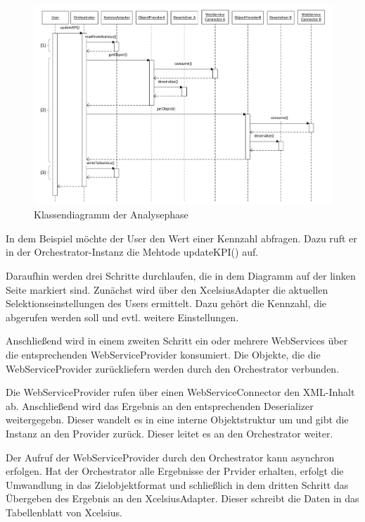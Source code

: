 \begin{figure}[h]
\centering
\setlength{\unitlength}{1mm}
\includegraphics[width=15cm]{Visio/Analyse-Sequenz.pdf}
\caption{Klassendiagramm der Analysephase\label{fig:sequenz_analyse}}
\end{figure}


In dem Beispiel möchte der User den Wert einer Kennzahl abfragen. Dazu ruft er in der Orchestrator-Instanz die Mehtode updateKPI() auf.

Daraufhin werden drei Schritte durchlaufen, die in dem Diagramm auf der linken Seite markiert sind. Zunächst wird über den XcelsiusAdapter die aktuellen Selektionseinstellungen des Users ermittelt. Dazu gehört die Kennzahl, die abgerufen werden soll und evtl. weitere Einstellungen.

Anschließend wird in einem zweiten Schritt ein oder mehrere WebServices über die entsprechenden WebServiceProvider konsumiert. Die Objekte, die die WebServiceProvider zurückliefern werden durch den Orchestrator verbunden.

Die WebServiceProvider rufen über einen WebServiceConnector den XML-Inhalt ab. Anschließend wird das Ergebnis an den entsprechenden Deserializer weitergegebn. Dieser wandelt es in eine interne Objektstruktur um und gibt die Instanz an den Provider zurück. Dieser leitet es an den Orchestrator weiter.

Der Aufruf der WebServiceProvider durch den Orchestrator kann asynchron erfolgen. Hat der Orchestrator alle Ergebnisse der Prvider erhalten, erfolgt die Umwandlung in das Zielobjektformat und schließlich in dem dritten Schritt das Übergeben des Ergebnis an den XcelsiusAdapter. Dieser schreibt die Daten in das Tabellenblatt von Xcelsius.


